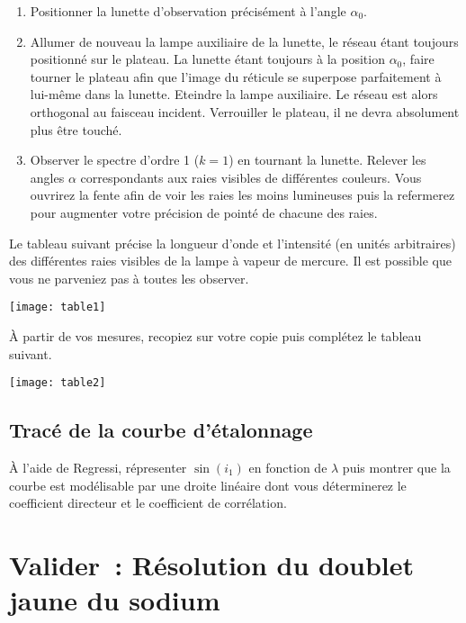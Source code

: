 \documentclass[a4paper, 12pt, final, garamond]{book}
\begin{document}
\begin{enumerate}
    \item Positionner la lunette d'observation précisément à l'angle $\alpha_0$. 

    \item Allumer de nouveau la lampe auxiliaire de la lunette, le réseau étant
        toujours positionné sur le plateau. La lunette étant toujours à la
        position $\alpha_0$, faire tourner le plateau afin que l'image du
        réticule se superpose parfaitement à lui-même dans la lunette. Eteindre
        la lampe auxiliaire. Le réseau est alors orthogonal au faisceau
        incident. Verrouiller le plateau, il ne devra absolument plus être
        touché.

    \item Observer le spectre d'ordre 1 ($k = 1$) en tournant la lunette.
        Relever les angles $\alpha$ correspondants aux raies visibles de
        différentes couleurs. Vous ouvrirez la fente afin de voir les raies les
        moins lumineuses puis la refermerez pour augmenter votre précision de
        pointé de chacune des raies.
\end{enumerate}

Le tableau suivant précise la longueur d'onde et l'intensité (en unités
arbitraires) des différentes raies visibles de la lampe à vapeur de mercure. Il
est possible que vous ne parveniez pas à toutes les observer. 

\begin{center}
    \texttt{[image: table1]}
\end{center}

À partir de vos mesures, recopiez sur votre copie puis complétez le tableau suivant.   
  
\begin{center}
    \texttt{[image: table2]}
\end{center}

\subsection{Tracé de la courbe d'étalonnage}

À l'aide de Regressi, répresenter $\sin(i_1)$ en fonction de $\lambda$ puis
montrer que la courbe est modélisable par une droite linéaire dont vous
déterminerez le coefficient directeur et le coefficient de corrélation. 

\section{Valider~: Résolution du doublet jaune du sodium}
\end{document}
